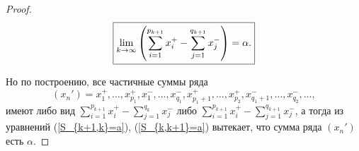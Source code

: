 \begin{proof}
\begin{equation}\label{S_{k,k+1}=a}
    \boxed{
    \lim_{k\to \infty} \left( \sum_{i=1}^{p_{k+1}}x_i^+ - \sum_{j=1}^{q_{k+1}}x_j^- \right) = \alpha.    
    }
\end{equation}

Но по построению, все частичные суммы ряда 
\[
 (x_n') = x_1^+, \ldots, x_{p_1}^+, x_1^-, \ldots, x_{q_1}^-, x_{p_1+1}^+, \ldots, x_{p_2}^+, x_{q_1+1}^-, \ldots, x_{q_2}^-, \ldots,
\]
имеют либо вид $\sum_{i=1}^{p_{k+1}}x_i^+ - \sum_{j=1}^{q_k}x_j^-$ либо $ \sum_{i=1}^{p_{k+1}}x_i^+ - \sum_{j=1}^{q_{k+1}}x_j^-$, а тогда из уравнений (\ref{S_{k+1,k}=a}), (\ref{S_{k,k+1}=a}) вытекает, что сумма ряда $(x_n')$ есть $\alpha.$

\end{proof}
